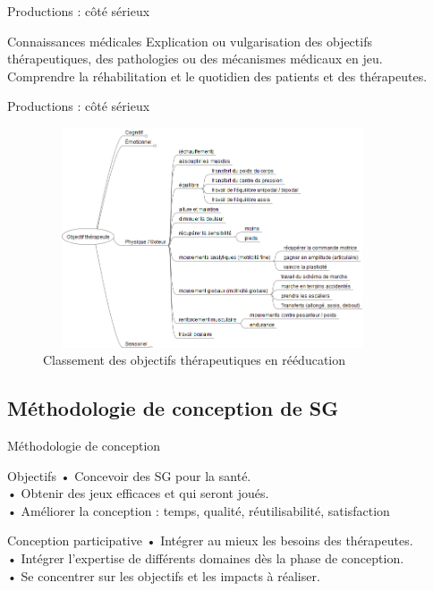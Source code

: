 \documentclass{beamer}
\begin{document}
		\begin{frame}{Productions : côté sérieux}
			\begin{block}{Connaissances médicales}
			Explication ou vulgarisation des objectifs thérapeutiques, des pathologies ou des mécanismes médicaux en jeu.\\
			Comprendre la réhabilitation et le quotidien des patients et des thérapeutes.
			\end{block}
		\end{frame}	
		
		\begin{frame}{Productions : côté sérieux}
			\begin{figure}
			\includegraphics[width=10cm, height=6.5cm]{../images/objectifs_moteurs.png}
			\caption{Classement des objectifs thérapeutiques en rééducation}
			\end{figure}
		\end{frame}
			
		\subsection{Méthodologie de conception de SG}
		\begin{frame}{Méthodologie de conception}
			\begin{exampleblock}{Objectifs}
				• Concevoir des SG pour la santé.\\ 
				• Obtenir des jeux efficaces et qui seront joués.\\ 
				• Améliorer la conception : temps, qualité, réutilisabilité, satisfaction 
			\end{exampleblock} 
			\begin{alertblock}{Conception participative}
				• Intégrer au mieux les besoins des thérapeutes.\\
				• Intégrer l'expertise de différents domaines dès la phase de conception.\\
				• Se concentrer sur les objectifs et les impacts à réaliser.
			\end{alertblock}
		\end{frame}			
		
\end{document}
